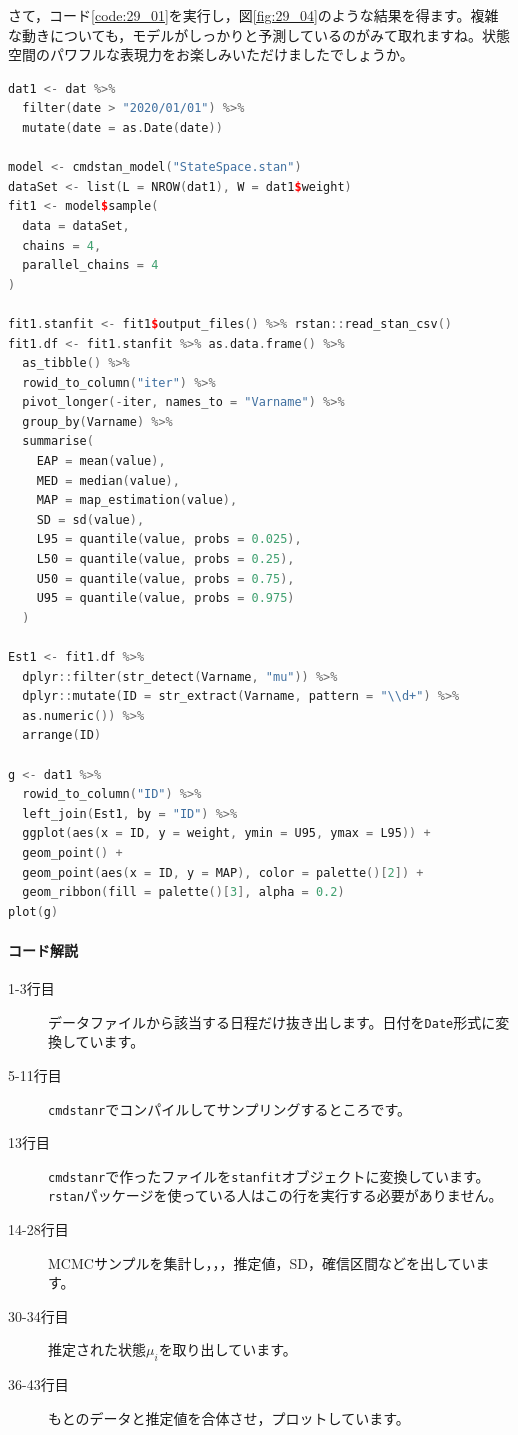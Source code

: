 \documentclass{ltjsbook}
\begin{document}
さて，コード\ref{code:29_01}を実行し，図\ref{fig:29_04}のような結果を得ます。複雑な動きについても，モデルがしっかりと予測しているのがみて取れますね。状態空間のパワフルな表現力をお楽しみいただけましたでしょうか。
\begin{lstlisting}[language=c++,label={code:29_01},caption={状態空間モデルのコード}]
dat1 <- dat %>%
  filter(date > "2020/01/01") %>%
  mutate(date = as.Date(date))

model <- cmdstan_model("StateSpace.stan")
dataSet <- list(L = NROW(dat1), W = dat1$weight)
fit1 <- model$sample(
  data = dataSet,
  chains = 4,
  parallel_chains = 4
)

fit1.stanfit <- fit1$output_files() %>% rstan::read_stan_csv()
fit1.df <- fit1.stanfit %>% as.data.frame() %>%
  as_tibble() %>%
  rowid_to_column("iter") %>%
  pivot_longer(-iter, names_to = "Varname") %>%
  group_by(Varname) %>%
  summarise(
    EAP = mean(value),
    MED = median(value),
    MAP = map_estimation(value),
    SD = sd(value),
    L95 = quantile(value, probs = 0.025),
    L50 = quantile(value, probs = 0.25),
    U50 = quantile(value, probs = 0.75),
    U95 = quantile(value, probs = 0.975)
  )

Est1 <- fit1.df %>%
  dplyr::filter(str_detect(Varname, "mu")) %>%
  dplyr::mutate(ID = str_extract(Varname, pattern = "\\d+") %>% 
  as.numeric()) %>%
  arrange(ID)

g <- dat1 %>%
  rowid_to_column("ID") %>%
  left_join(Est1, by = "ID") %>%
  ggplot(aes(x = ID, y = weight, ymin = U95, ymax = L95)) +
  geom_point() +
  geom_point(aes(x = ID, y = MAP), color = palette()[2]) +
  geom_ribbon(fill = palette()[3], alpha = 0.2)
plot(g)
\end{lstlisting}
\paragraph{コード解説}
\begin{description}
	\item[1-3行目] データファイルから該当する日程だけ抜き出します。日付を\verb|Date|形式に変換しています。
	\item[5-11行目] \verb|cmdstanr|でコンパイルしてサンプリングするところです。
	\item[13行目] \verb|cmdstanr|で作ったファイルを\verb|stanfit|オブジェクトに変換しています。\verb|rstan|パッケージを使っている人はこの行を実行する必要がありません。
	\item[14-28行目] MCMCサンプルを集計し，，，推定値，SD，確信区間などを出しています。
	\item[30-34行目] 推定された状態$\mu_i$を取り出しています。
	\item[36-43行目] もとのデータと推定値を合体させ，プロットしています。
\end{description}
\end{document}
